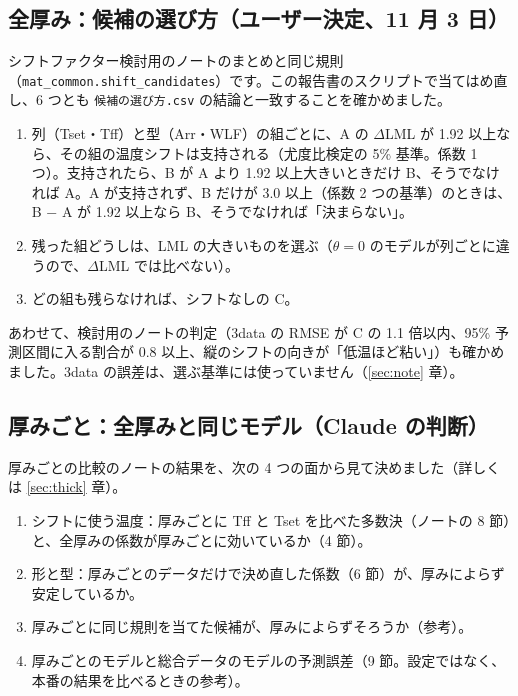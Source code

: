 \documentclass[paper=a4paper,fontsize=10.5pt,line_length=44zw,number_of_lines=40]{jlreq}
\begin{document}
\subsection{全厚み：候補の選び方（ユーザー決定、11 月 3 日）}
シフトファクター検討用のノートのまとめと同じ規則（\texttt{mat\_\allowbreak{}common.shift\_\allowbreak{}candidates}）です。この報告書のスクリプトで当てはめ直し、6 つとも \texttt{候補の選び方.csv} の結論と一致することを確かめました。
\begin{enumerate}[itemsep=0.3ex,topsep=0.4ex]
\item 列（Tset・Tff）と型（Arr・WLF）の組ごとに、A の $\Delta$LML が 1.92 以上なら、その組の温度シフトは支持される（尤度比検定の 5\% 基準。係数 1 つ）。支持されたら、B が A より 1.92 以上大きいときだけ B、そうでなければ A。A が支持されず、B だけが 3.0 以上（係数 2 つの基準）のときは、B − A が 1.92 以上なら B、そうでなければ「決まらない」。
\item 残った組どうしは、LML の大きいものを選ぶ（$\theta = 0$ のモデルが列ごとに違うので、$\Delta$LML では比べない）。
\item どの組も残らなければ、シフトなしの C。
\end{enumerate}
あわせて、検討用のノートの判定（3data の RMSE が C の 1.1 倍以内、95\% 予測区間に入る割合が 0.8 以上、縦のシフトの向きが「低温ほど粘い」）も確かめました。3data の誤差は、選ぶ基準には使っていません（\ref{sec:note} 章）。

\subsection{厚みごと：全厚みと同じモデル（Claude の判断）}
厚みごとの比較のノートの結果を、次の 4 つの面から見て決めました（詳しくは \ref{sec:thick} 章）。
\begin{enumerate}[itemsep=0.3ex,topsep=0.4ex]
\item シフトに使う温度：厚みごとに Tff と Tset を比べた多数決（ノートの 8 節）と、全厚みの係数が厚みごとに効いているか（4 節）。
\item 形と型：厚みごとのデータだけで決め直した係数（6 節）が、厚みによらず安定しているか。
\item 厚みごとに同じ規則を当てた候補が、厚みによらずそろうか（参考）。
\item 厚みごとのモデルと総合データのモデルの予測誤差（9 節。設定ではなく、本番の結果を比べるときの参考）。
\end{enumerate}
\end{document}
